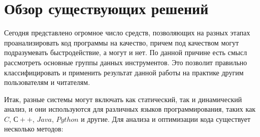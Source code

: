 \documentclass{mipt-thesis-bs}
\begin{document}
\chapter{Обзор существующих решений}
Сегодня представлено огромное число средств, позволяющих на разных этапах проанализировать код программы на качество,
причем под качеством могут подразумевать быстродействие, а могут и нет. По данной причине есть смысл
рассмотреть основные группы данных инструментов. Это позволит правильно классифицировать и применить результат данной
работы на практике другим пользователям и читателям.

Итак, разные системы могут включать как статический, так и динамический анализ, и они
используются для различных языков программирования, таких как $C$, $С++$, $Java$, $Python$ и другие.
Для анализа и оптимизации кода существует несколько методов:
\end{document}
